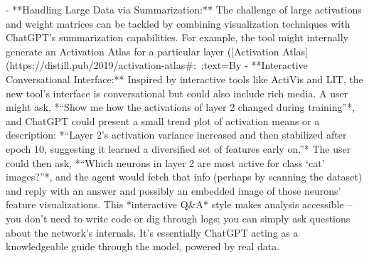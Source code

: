 - **Handling Large Data via Summarization:** The challenge of large activations and weight matrices can be tackled by combining visualization techniques with ChatGPT’s summarization capabilities. For example, the tool might internally generate an Activation Atlas for a particular layer  ([Activation Atlas](https://distill.pub/2019/activation-atlas#:~:text=By%
- **Interactive Conversational Interface:** Inspired by interactive tools like ActiVis and LIT, the new tool’s interface is conversational but could also include rich media. A user might ask, *“Show me how the activations of layer 2 changed during training”*, and ChatGPT could present a small trend plot of activation means or a description: *“Layer 2’s activation variance increased and then stabilized after epoch 10, suggesting it learned a diversified set of features early on.”* The user could then ask, *“Which neurons in layer 2 are most active for class ‘cat’ images?”*, and the agent would fetch that info (perhaps by scanning the dataset) and reply with an answer and possibly an embedded image of those neurons’ feature visualizations. This *interactive Q&A* style makes analysis accessible – you don’t need to write code or dig through logs; you can simply ask questions about the network’s internals. It’s essentially ChatGPT acting as a knowledgeable guide through the model, powered by real data.
